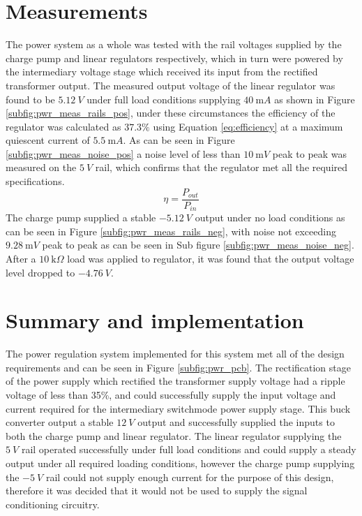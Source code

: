 \section{Measurements} \label{sec:pwr_meas}
The power system as a whole was tested with the rail voltages supplied by the charge pump and linear regulators respectively, which in turn were powered by the intermediary voltage stage which received its input from the rectified transformer output. The measured output voltage of the linear regulator was found to be $\SI{5.12}{V}$ under full load conditions supplying $\SI{40}{\milli A}$ as shown in Figure \ref{subfig:pwr_meas_rails_pos}, under these circumstances the efficiency of the regulator was calculated as $37.3\%$ using Equation \ref{eq:efficiency} at a maximum quiescent current of $\SI{5.5}{\milli A}$. As can be seen in Figure \ref{subfig:pwr_meas_noise_pos} a noise level of less than $\SI{10}{\milli V}$ peak to peak was measured on the $\SI{5}{V}$ rail, which confirms that the regulator met all the required specifications.
\begin{equation}
   \eta = \frac{P_{out}}{P_{in}}
   \label{eq:efficiency}
\end{equation}
The charge pump supplied a stable $\SI{-5.12}{V}$ output under no load conditions as can be seen in Figure \ref{subfig:pwr_meas_rails_neg}, with noise not exceeding $\SI{9.28}{\milli V}$ peak to peak as can be seen in Sub figure \ref{subfig:pwr_meas_noise_neg}. After a $\SI{10}{\kilo \Omega}$ load was applied to regulator, it was found that the output voltage level dropped to $\SI{-4.76}{V}$.

\section{Summary and implementation}
The power regulation system implemented for this system met all of the design requirements and can be seen in Figure \ref{subfig:pwr_pcb}. The rectification stage of the power supply which rectified the transformer supply voltage had a ripple voltage of less than 35\%, and could successfully supply the input voltage and current required for the intermediary switchmode power supply stage. This buck converter output a stable $\SI{12}{V}$ output and successfully supplied the inputs to both the charge pump and linear regulator. The linear regulator supplying the $\SI{5}{V}$ rail operated successfully under full load conditions and could supply a steady output under all required loading conditions, however the charge pump supplying the $\SI{-5}{V}$ rail could not supply enough current for the purpose of this design, therefore it was decided that it would not be used to supply the signal conditioning circuitry.

